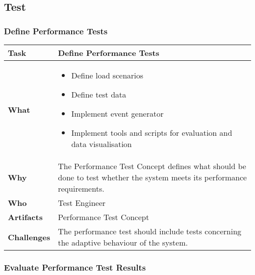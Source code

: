 \subsection{Test}

\subsubsection{Define Performance Tests}
\begin{tabularx}{\textwidth}{@{} l X @{}}
	\caption{Define Performance Tests} \label{table:ch6_Task_Define_Performance_Tests}\\
	\toprule 
	\bfseries Task & Define Performance Tests\\
	\midrule 
	\bfseries What &
	\begin{itemize}
		\item Define load scenarios
		\item Define test data
		\item Implement event generator
		\item Implement tools and scripts for evaluation and data visualisation
	\end{itemize}
	\\
	\midrule 
	\bfseries Why & The Performance Test Concept defines what should be done to test whether the system meets its performance requirements.\\
	\midrule 
	\bfseries Who & Test Engineer\\
	\midrule 
	\bfseries Artifacts & Performance Test Concept\\
	\midrule 
	\bfseries Challenges & The performance test should include tests concerning the adaptive behaviour of the system.\\
	\bottomrule 
\end{tabularx}

\subsubsection{Evaluate Performance Test Results}

